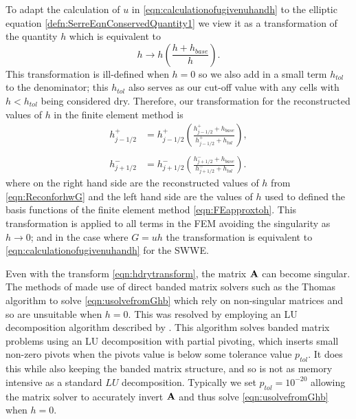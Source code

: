 To adapt the calculation of $u$ in \eqref{eqn:calculationofugivenuhandh} to the elliptic equation \eqref{defn:SerreEqnConservedQuantity1} we view it as a transformation of the quantity $h$ which is equivalent to
\begin{equation}
h \rightarrow h \left( \frac{h + h_{base}}{h} \right).
\end{equation}
This transformation is ill-defined when $h = 0$ so we also add in a  small term $h_{tol}$ to the denominator; this $h_{tol}$ also serves as our cut-off value with any cells with $h < h_{tol}$ being considered dry. Therefore, our transformation for the reconstructed values of $h$ in the finite element method is
\begin{subequations}
	\begin{align}
	h^+_{j-1/2} & = h^+_{j-1/2} \left(\frac{ h^+_{j-1/2}  + h_{base}}{h^+_{j-1/2} + h_{tol}}\right) , \\ \nonumber\\
	h^-_{j+1/2} & = h^-_{j+1/2} \left(\frac{ h^-_{j+1/2}  + h_{base}}{h^-_{j+1/2} + h_{tol}}\right).
	\end{align} 
	\label{eqn:hdrytransform}
\end{subequations}
where on the right hand side are the reconstructed values of $h$ from \eqref{eqn:ReconforhwG} and the left hand side are the values of $h$ used to defined the basis functions of the finite element method \eqref{eqn:FEapproxtoh}. This transformation is applied to all terms in the FEM avoiding the singularity as $h \rightarrow 0$; and in the case where $G = uh$ the transformation is equivalent to \eqref{eqn:calculationofugivenuhandh} for the SWWE.

Even with the transform \eqref{eqn:hdrytransform}, the matrix $\mathbf{A}$ can become singular.
The methods of \citet{Zoppou-etal-2017} made use of direct banded matrix solvers such as the Thomas algorithm \cite{Conte-DeBoor-1980} to solve \eqref{eqn:usolvefromGhb} which rely on non-singular matrices and so are unsuitable when $h = 0$. This was resolved by employing an LU decomposition algorithm described by \citet{NumRecC-1996}. This algorithm solves banded matrix problems using an LU decomposition with partial pivoting, which inserts small non-zero pivots when the pivots value is below some tolerance value $p_{tol}$. It does this while also keeping the banded matrix structure, and so is not as memory intensive as a standard $LU$ decomposition. Typically we set $p_{tol} = 10^{-20}$ allowing the matrix solver to accurately invert $\mathbf{A}$ and thus solve \eqref{eqn:usolvefromGhb} when $h = 0$. 

